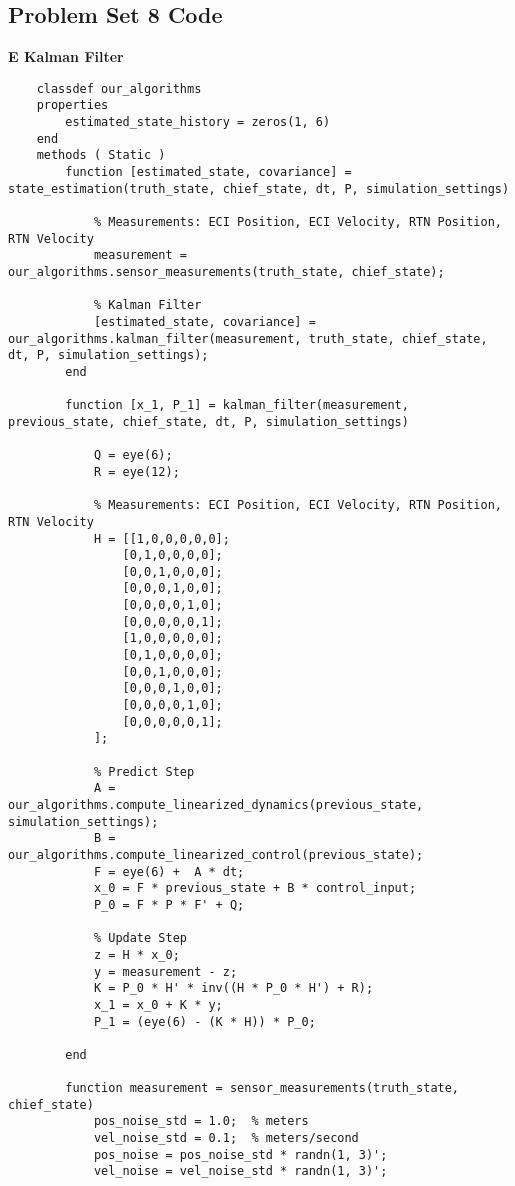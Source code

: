 \subsection{Problem Set 8 Code}

\textbf{E Kalman Filter}
\begin{lstlisting}
    classdef our_algorithms
    properties
        estimated_state_history = zeros(1, 6)
    end
    methods ( Static )
        function [estimated_state, covariance] = state_estimation(truth_state, chief_state, dt, P, simulation_settings)
        
            % Measurements: ECI Position, ECI Velocity, RTN Position, RTN Velocity
            measurement = our_algorithms.sensor_measurements(truth_state, chief_state);
            
            % Kalman Filter
            [estimated_state, covariance] = our_algorithms.kalman_filter(measurement, truth_state, chief_state, dt, P, simulation_settings);
        end

        function [x_1, P_1] = kalman_filter(measurement, previous_state, chief_state, dt, P, simulation_settings)

            Q = eye(6);
            R = eye(12);

            % Measurements: ECI Position, ECI Velocity, RTN Position, RTN Velocity
            H = [[1,0,0,0,0,0];
                [0,1,0,0,0,0];
                [0,0,1,0,0,0];
                [0,0,0,1,0,0];
                [0,0,0,0,1,0];
                [0,0,0,0,0,1];
                [1,0,0,0,0,0];
                [0,1,0,0,0,0];
                [0,0,1,0,0,0];
                [0,0,0,1,0,0];
                [0,0,0,0,1,0];
                [0,0,0,0,0,1];
            ];

            % Predict Step
            A = our_algorithms.compute_linearized_dynamics(previous_state, simulation_settings);
            B = our_algorithms.compute_linearized_control(previous_state);
            F = eye(6) +  A * dt;
            x_0 = F * previous_state + B * control_input;
            P_0 = F * P * F' + Q;

            % Update Step
            z = H * x_0;
            y = measurement - z;
            K = P_0 * H' * inv((H * P_0 * H') + R);
            x_1 = x_0 + K * y;
            P_1 = (eye(6) - (K * H)) * P_0;
            
        end

        function measurement = sensor_measurements(truth_state, chief_state)
            pos_noise_std = 1.0;  % meters
            vel_noise_std = 0.1;  % meters/second
            pos_noise = pos_noise_std * randn(1, 3)';
            vel_noise = vel_noise_std * randn(1, 3)';


\end{lstlisting}
